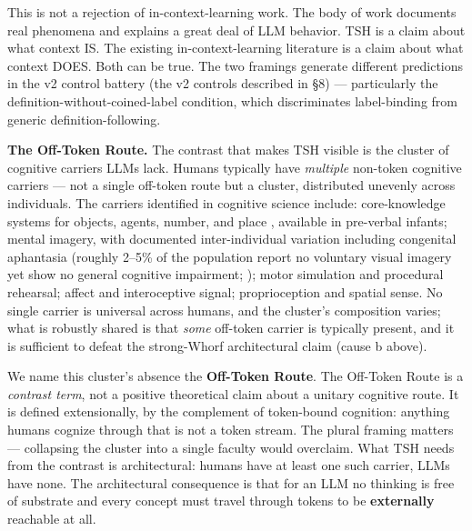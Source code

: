 \documentclass[11pt,a4paper]{article}
\begin{document}
This is not a rejection of in-context-learning work. The body of work documents real phenomena and explains a great deal of LLM behavior. TSH is a claim about what context IS. The existing in-context-learning literature is a claim about what context DOES. Both can be true. The two framings generate different predictions in the v2 control battery (the v2 controls described in \S8) --- particularly the definition-without-coined-label condition, which discriminates label-binding from generic definition-following.

\textbf{The Off-Token Route.} The contrast that makes TSH visible is the cluster of cognitive carriers LLMs lack. Humans typically have \textit{multiple} non-token cognitive carriers --- not a single off-token route but a cluster, distributed unevenly across individuals. The carriers identified in cognitive science include: core-knowledge systems for objects, agents, number, and place \citep{spelke2000core,carey2009origin}, available in pre-verbal infants; mental imagery, with documented inter-individual variation including congenital aphantasia (roughly 2--5\% of the population report no voluntary visual imagery yet show no general cognitive impairment; \citealt{zeman2015lives}); motor simulation and procedural rehearsal; affect and interoceptive signal; proprioception and spatial sense. No single carrier is universal across humans, and the cluster's composition varies; what is robustly shared is that \textit{some} off-token carrier is typically present, and it is sufficient to defeat the strong-Whorf architectural claim (cause b above).

We name this cluster's absence the \textbf{Off-Token Route}. The Off-Token Route is a \textit{contrast term}, not a positive theoretical claim about a unitary cognitive route. It is defined extensionally, by the complement of token-bound cognition: anything humans cognize through that is not a token stream. The plural framing matters --- collapsing the cluster into a single faculty would overclaim. What TSH needs from the contrast is architectural: humans have at least one such carrier, LLMs have none. The architectural consequence is that for an LLM no thinking is free of substrate and every concept must travel through tokens to be \textbf{externally} reachable at all.
\end{document}
